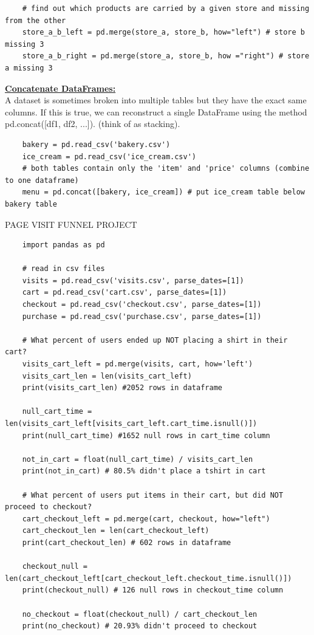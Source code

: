 \documentclass[11pt, a4paper]{article}
\begin{document}
\begin{spacing}{1.1}
\begin{lstlisting}
	# find out which products are carried by a given store and missing from the other
	store_a_b_left = pd.merge(store_a, store_b, how="left") # store b missing 3
	store_a_b_right = pd.merge(store_a, store_b, how ="right") # store a missing 3 \end{lstlisting}\vspace*{1mm}
	\underline{\textbf{Concatenate DataFrames:}} \\
	A dataset is sometimes broken into multiple tables but they have the exact same columns. If this is true, we can reconstruct a single DataFrame using the method pd.concat([df1, df2, ...]). (think of as stacking).
	\begin{lstlisting}
	bakery = pd.read_csv('bakery.csv')
	ice_cream = pd.read_csv('ice_cream.csv')
	# both tables contain only the 'item' and 'price' columns (combine to one dataframe)
	menu = pd.concat([bakery, ice_cream]) # put ice_cream table below bakery table \end{lstlisting}\newpage
	\noindent PAGE VISIT FUNNEL PROJECT
	\begin{lstlisting}
	import pandas as pd
	
	# read in csv files
	visits = pd.read_csv('visits.csv', parse_dates=[1])
	cart = pd.read_csv('cart.csv', parse_dates=[1])
	checkout = pd.read_csv('checkout.csv', parse_dates=[1])
	purchase = pd.read_csv('purchase.csv', parse_dates=[1])
	
	# What percent of users ended up NOT placing a shirt in their cart?
	visits_cart_left = pd.merge(visits, cart, how='left') 
	visits_cart_len = len(visits_cart_left)
	print(visits_cart_len) #2052 rows in dataframe
	
	null_cart_time = len(visits_cart_left[visits_cart_left.cart_time.isnull()])
	print(null_cart_time) #1652 null rows in cart_time column
	
	not_in_cart = float(null_cart_time) / visits_cart_len
	print(not_in_cart) # 80.5% didn't place a tshirt in cart
	
	# What percent of users put items in their cart, but did NOT proceed to checkout?
	cart_checkout_left = pd.merge(cart, checkout, how="left")
	cart_checkout_len = len(cart_checkout_left)
	print(cart_checkout_len) # 602 rows in dataframe
	
	checkout_null = len(cart_checkout_left[cart_checkout_left.checkout_time.isnull()])
	print(checkout_null) # 126 null rows in checkout_time column
	
	no_checkout = float(checkout_null) / cart_checkout_len
	print(no_checkout) # 20.93% didn't proceed to checkout
	

\end{lstlisting}
\end{spacing}
\end{document}
